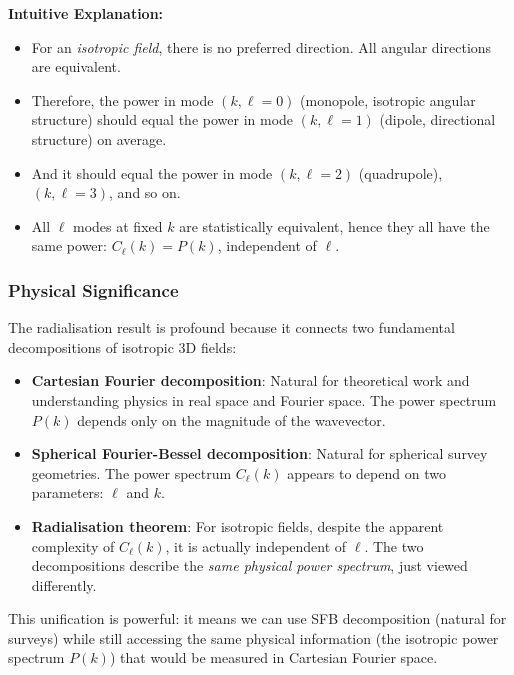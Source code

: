 \textbf{Intuitive Explanation:}

\begin{itemize}
    \item For an \emph{isotropic field}, there is no preferred direction. All angular directions are equivalent.
    \item Therefore, the power in mode $(k, \ell = 0)$ (monopole, isotropic angular structure) should equal the power in mode $(k, \ell = 1)$ (dipole, directional structure) on average.
    \item And it should equal the power in mode $(k, \ell = 2)$ (quadrupole), $(k, \ell = 3)$, and so on.
    \item All $\ell$ modes at fixed $k$ are statistically equivalent, hence they all have the same power: $C_\ell(k) = P(k)$, independent of $\ell$.
\end{itemize}

\subsubsection{Physical Significance}

The radialisation result is profound because it connects two fundamental decompositions of isotropic 3D fields:

\begin{itemize}
    \item \textbf{Cartesian Fourier decomposition}: Natural for theoretical work and understanding physics in real space and Fourier space. The power spectrum $P(k)$ depends only on the magnitude of the wavevector.
    
    \item \textbf{Spherical Fourier-Bessel decomposition}: Natural for spherical survey geometries. The power spectrum $C_\ell(k)$ appears to depend on two parameters: $\ell$ and $k$.
    
    \item \textbf{Radialisation theorem}: For isotropic fields, despite the apparent complexity of $C_\ell(k)$, it is actually independent of $\ell$. The two decompositions describe the \emph{same physical power spectrum}, just viewed differently.
\end{itemize}

This unification is powerful: it means we can use SFB decomposition (natural for surveys) while still accessing the same physical information (the isotropic power spectrum $P(k)$) that would be measured in Cartesian Fourier space.

